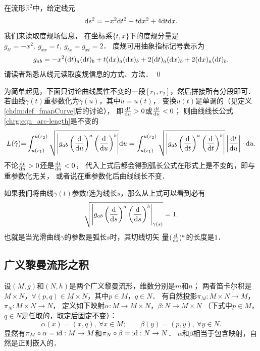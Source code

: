 \begin{example}
    在流形$\mathbb{R}^2$中，给定线元
    \begin{equation}
        {\rm d}s^2 = -x^2 {\rm d} t^2 + t {\rm d} x^2 + 4 {\rm d} t{\rm d} x.
    \end{equation}
    我们来读取度规场信息，
    在坐标系$\{t,x\}$下的度规分量是$g_{tt}=-x^2,\ g_{xx}=t,\ g_{tx}=g_{xt}=2 $．
    度规可用抽象指标记号表示为
    \begin{equation}
        g_{ab}= -x^2 ({\rm d} t)_a ({\rm d} t)_b +t ({\rm d} x)_a ({\rm d} x)_b
         + 2 ({\rm d} t)_a ({\rm d} x)_b + 2({\rm d} x)_a ({\rm d} t)_b .
    \end{equation}
    请读者熟悉从线元读取度规信息的方式、方法． \qed
\end{example}

为简单起见，下面只讨论曲线属性不变的一段$[r_1,r_2]$，然后拼接所有分段即可．
若曲线$\gamma(t)$重参数化为$\tilde{\gamma}(u)$，其中$u=u(t)$，
变换$u(t)$是单调的（见定义\ref{chdm:def_fmapCurve}后的讨论），
即$\frac{{\rm d} t }{{\rm d} u}>0$或$\frac{{\rm d} t }{{\rm d} u}<0$；
则曲线线长公式\eqref{chrg:eqn_arc-length}是不变的
\begin{align*}
    L(\tilde{\gamma}){=}\int_{u(r_1)}^{u(r_2)} \sqrt{\left| g_{ab} \left(\frac{{\rm d}  }
        {{\rm d} u}\right)^a\left(\frac{{\rm d}  }{{\rm d} u}\right)^b \right|} {\rm d}u
    =\int_{u(r_1)}^{u(r_2)} \sqrt{\left| g_{ab} \left(\frac{{\rm d}  }
        {{\rm d} t}\right)^a\left(\frac{{\rm d}  }{{\rm d} t}\right)^b\right|}
    \left|\frac{{\rm d} t }{{\rm d} u}\right| \cdot {\rm d}u .
\end{align*}  %
不论$\frac{{\rm d} t }{{\rm d} u}>0$还是$\frac{{\rm d} t }{{\rm d} u}<0$，
代入上式后都会得到弧长公式在形式上是不变的，即与重参数化无关，
或者说在重参数化后曲线线长不变．

如果我们将曲线$\gamma(t)$参数$t$选为线长$s$，那么从上式可以看到必有
\begin{equation}\label{chrg:eqn_arc-unit}
    \sqrt{\left| g_{ab} \left(\frac{{\rm d}  } {{\rm d} s}\right)^a
        \left(\frac{{\rm d}  }{{\rm d} s}\right)^b \right|_{\gamma(s)}} = 1.
\end{equation}
也就是当光滑曲线$\gamma$的参数是弧长$s$时，其切线切矢
量$(\frac{{\rm d}  }{{\rm d} s})^a$的长度是$1$．

\subsection{广义黎曼流形之积}
设$(M,g)$和$(N,h)$是两个广义黎曼流形，维数分别是$m$和$n$；
两者笛卡尔积是$M\times N$，$\forall(p,q)\in M\times N$，其中$p\in M$，$q\in N$．
有自然投影$\pi_M: M\times N\to M$，$\pi_N: M\times N\to N$，
定义如下映射$\alpha:M\to M\times N$，$\beta:N\to M\times N$
（下式中$p\in M$，$q\in N$是任取的，取定后固定不变）：
\begin{equation}
    \alpha(x)=(x,q),\ \forall x \in M; \qquad  \beta(y)=(p,y),\ \forall y \in N .
\end{equation}
显然有$\pi_M \circ \alpha = {\rm id}: M\to M$和$\pi_N \circ \beta = {\rm id}: N\to N$．
$\alpha$和$\beta$相当于包含映射，自然是正则嵌入的．

